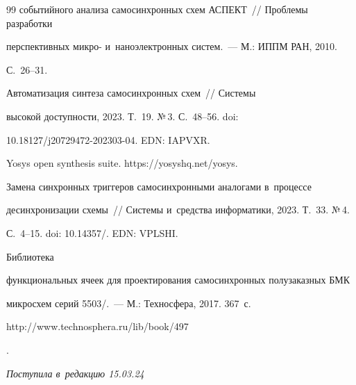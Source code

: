 {{\begin{thebibliography}{99}
событийного анализа самосинхронных схем АСПЕКТ~/\!\!/ Проб\-ле\-мы разработки 

перспективных микро- и~наноэлектронных сис\-тем.~--- М.: ИППМ РАН, 2010.  

С.~26--31.


 Автоматизация синтеза самосинхронных схем~/\!\!/ Сис\-те\-мы 

высокой доступности, 2023. Т.~19. №\,3. С.~48--56. doi:  

10.18127\!/\!j20729472-202303-04. EDN: IAPVXR.


Yosys open synthesis suite. {\sf https://yosyshq.net/yosys}.


     Замена синхронных триггеров самосинхронными аналогами в~процессе 

десинхронизации схемы~/\!\!/ Сис\-те\-мы и~средства информатики, 2023. Т.~33. №\,4. 

С.~4--15. doi: 10.14357\!/.  EDN: VPLSHI.




 Библиотека 

функциональных ячеек для проектирования самосинхронных полузаказных БМК 

микросхем серий 5503\!/.~--- М.: Техносфера, 2017. 367~с. {\sf 

http://www.\linebreak technosphera.ru/lib/book/497}.

     \end{thebibliography}

} }







\vspace*{-6pt}



\hfill{\small\textit{Поступила в~редакцию 15.03.24}}



\vspace*{8pt}




